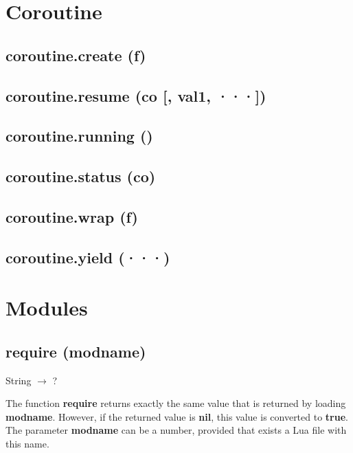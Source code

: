 \documentclass[12pt]{article}
\begin{document}
\newpage

\section{Coroutine}

\subsection{coroutine.create (f)}

\subsection{coroutine.resume (co [, val1, ···])}

\subsection{coroutine.running ()}

\subsection{coroutine.status (co)}

\subsection{coroutine.wrap (f)}

\subsection{coroutine.yield (···)}

\newpage

\section{Modules}

\subsection{require (modname)}

String $\rightarrow$ ?

The function \textbf{require} returns exactly the same value that is
returned by loading \textbf{modname}.
However, if the returned value is \textbf{nil}, this value is
converted to \textbf{true}.
The parameter \textbf{modname} can be a number, provided that exists
a Lua file with this name.

\newpage
\end{document}
